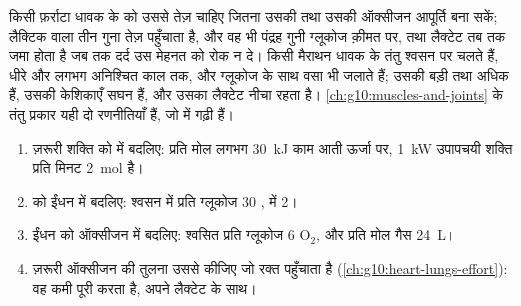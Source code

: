 \begin{example}[पेशी का चुनाव]\label{ex:g12:respiration-fermentation:muscle}
किसी फ़र्राटा धावक के  को  उससे तेज़ चाहिए जितना उसकी
 तथा उसकी ऑक्सीजन आपूर्ति बना सकें; लैक्टिक  वाला
  तीन गुना तेज़ पहुँचाता है, और वह भी पंद्रह गुनी ग्लूकोज
क़ीमत पर, तथा लैक्टेट तब तक जमा होता है जब तक दर्द उस मेहनत को रोक न दे।
किसी मैराथन धावक के तंतु श्वसन पर चलते हैं, धीरे और लगभग अनिश्चित काल तक,
और ग्लूकोज के साथ वसा भी जलाते हैं; उसकी  बड़ी तथा अधिक हैं,
उसकी केशिकाएँ सघन हैं, और उसका लैक्टेट नीचा रहता है।
\cref{ch:g10:muscles-and-joints} के तंतु प्रकार यही दो रणनीतियाँ हैं, जो
 में गढ़ी हैं।
\end{example}

\begin{method}[किसी ऊर्जा बजट का संतुलन]\label{met:g12:respiration-fermentation:budget}
\begin{enumerate}
  \item ज़रूरी शक्ति को  में बदलिए: प्रति मोल  लगभग \qty{30}{kJ}
        काम आती ऊर्जा पर, \qty{1}{kW} उपापचयी शक्ति प्रति मिनट
        \qty{2}{mol}  है।
  \item {} को ईंधन में बदलिए: श्वसन में प्रति ग्लूकोज 30 ,  में
        2।
  \item ईंधन को ऑक्सीजन में बदलिए: श्वसित प्रति ग्लूकोज 6 $\mathrm{O_2}$,
        और प्रति मोल गैस \qty{24}{L}।
  \item ज़रूरी ऑक्सीजन की तुलना उससे कीजिए जो रक्त पहुँचाता है
        (\cref{ch:g10:heart-lungs-effort}): वह कमी  पूरी करता है,
        अपने लैक्टेट के साथ।
\end{enumerate}
\end{method}

